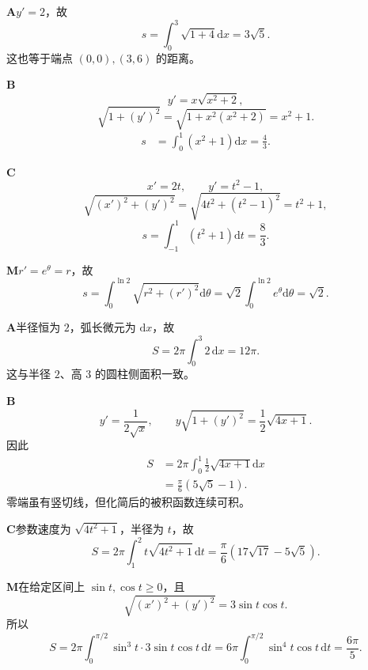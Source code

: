 \begin{solutionBox}
\textbf{A}\quad \(y'=2\)，故
\[
s=\int_0^3\sqrt{1+4}\mathrm dx=3\sqrt5.
\]
这也等于端点 \((0,0),(3,6)\) 的距离。
\end{solutionBox}
\begin{solutionBox}
\textbf{B}\quad
\[
y'=x\sqrt{x^2+2},
\]
\[
\sqrt{1+(y')^2}
=\sqrt{1+x^2(x^2+2)}
=x^2+1.
\]
\[
\begin{aligned}
s&=\int_0^1(x^2+1)\mathrm dx
=\frac43.
\end{aligned}
\]
\end{solutionBox}
\begin{solutionBox}
\textbf{C}\quad
\[
x'=2t,\qquad y'=t^2-1,
\]
\[
\sqrt{(x')^2+(y')^2}
=\sqrt{4t^2+(t^2-1)^2}
=t^2+1,
\]
\[
s=\int_{-1}^{1}(t^2+1)\mathrm dt=\frac83.
\]
\end{solutionBox}
\begin{solutionBox}
\textbf{M}\quad \(r'=e^\theta=r\)，故
\[
s=\int_0^{\ln2}\sqrt{r^2+(r')^2}\mathrm d\theta
=\sqrt2\int_0^{\ln2}e^\theta\mathrm d\theta
=\sqrt2.
\]
\end{solutionBox}

\begin{solutionBox}
\textbf{A}\quad 半径恒为 \(2\)，弧长微元为 \(\mathrm dx\)，故
\[
S=2\pi\int_0^3 2\,\mathrm dx=12\pi.
\]
这与半径 \(2\)、高 \(3\) 的圆柱侧面积一致。
\end{solutionBox}
\begin{solutionBox}
\textbf{B}\quad
\[
y'=\frac1{2\sqrt x},\qquad
y\sqrt{1+(y')^2}=\frac12\sqrt{4x+1}.
\]
因此
\[
\begin{aligned}
S&=2\pi\int_0^1\frac12\sqrt{4x+1}\mathrm dx\\
&=\frac\pi6\left(5\sqrt5-1\right).
\end{aligned}
\]
零端虽有竖切线，但化简后的被积函数连续可积。
\end{solutionBox}
\begin{solutionBox}
\textbf{C}\quad 参数速度为 \(\sqrt{4t^2+1}\)，半径为 \(t\)，故
\[
S=2\pi\int_1^2t\sqrt{4t^2+1}\,\mathrm dt
=\frac\pi6\left(17\sqrt{17}-5\sqrt5\right).
\]
\end{solutionBox}
\begin{solutionBox}
\textbf{M}\quad 在给定区间上 \(\sin t,\cos t\ge0\)，且
\[
\sqrt{(x')^2+(y')^2}
=3\sin t\cos t.
\]
所以
\[
S=2\pi\int_0^{\pi/2}\sin^3t\cdot3\sin t\cos t\,\mathrm dt
=6\pi\int_0^{\pi/2}\sin^4t\cos t\,\mathrm dt
=\frac{6\pi}{5}.
\]
\end{solutionBox}
